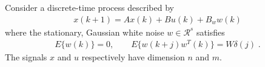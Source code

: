 \item
Consider a discrete-time process described by
\begin{align*}
    x(k+1) = Ax(k) + Bu(k) + B_w w(k)
\end{align*}
where the stationary, Gaussian white noise $w \in \mathcal{R}^s$ satisfies
\begin{align*}
    E \{ w(k) \} = 0, \qquad  E \{ w(k+j) w^T (k) \} = W \delta(j) \; .
\end{align*}
The signals $x$ and $u$ respectively have dimension $n$ and $m$. 

